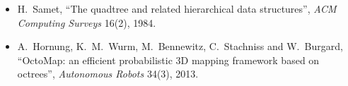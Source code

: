 \begin{itemize}[nosep,leftmargin=1.5em]
\item H.~Samet, ``The quadtree and related hierarchical data
  structures'', \emph{ACM Computing Surveys} 16(2), 1984.
\item A.~Hornung, K.~M.~Wurm, M.~Bennewitz, C.~Stachniss and W.~Burgard,
  ``OctoMap: an efficient probabilistic 3D mapping framework based on
  octrees'', \emph{Autonomous Robots} 34(3), 2013.
\end{itemize}


